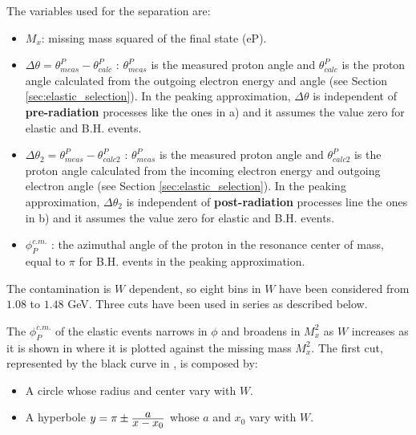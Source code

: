 The variables used for the separation are:
\begin{itemize}
 \item {\boldmath $M_x$:} missing mass squared of the final state (eP). 
 
 \item {\boldmath $\Delta\theta = \theta^P_{meas} - \theta^P_{calc}$ :} $\theta^P_{meas}$ is the measured proton angle
                  and $\theta^P_{calc}$ is the proton angle calculated from the outgoing electron energy and angle 
                  (see Section \ref{sec:elastic_selection}). In the peaking approximation, $\Delta\theta$ is  
		  independent of {\bf pre-radiation} processes like the ones in  a) 
		  and it assumes the value zero for elastic and B.H. events.
 
 \item {\boldmath $\Delta\theta_2=\theta^P_{meas} - \theta^P_{calc2}$ :} $\theta^P_{meas}$ is the measured proton angle
                  and $\theta^P_{calc2}$ is the proton angle calculated from the incoming electron energy and 
		  outgoing electron angle (see Section \ref{sec:elastic_selection}). In the peaking approximation, $\Delta\theta_2$ is  
		  independent of {\bf post-radiation} processes line the ones in  b) 
		  and it assumes the value zero for elastic and B.H. events.

 \item{\boldmath $\phi_P^{c.m.}$ :} the azimuthal angle of the proton in the resonance center of mass,  equal 
       to $\pi$ for B.H. events in the peaking approximation.       
\end{itemize}
The contamination is $W$ dependent, so eight bins in $W$ have been considered from $1.08$ to $1.48$ GeV. 
Three cuts have been used in series as described below.

The $\phi_P^{c.m.}$ of the elastic events narrows in $\phi$ and broadens in $M_x^2$ as $W$ increases as 
it is shown in  where it is plotted against the missing mass $M_x^2$.
The first cut, represented by the black curve in , is composed by:
\begin{itemize}
 \item A circle whose radius and center vary with $W$.
 \item A hyperbole $y = \pi \pm \frac{\displaystyle a}{\displaystyle x-x_0}$ whose $a$ and $x_0$ vary with $W$.
\end{itemize}

